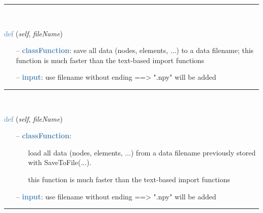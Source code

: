 \begin{itemize}[leftmargin=1.4cm]
\begin{itemize}[leftmargin=1.4cm]
\begin{itemize}[leftmargin=0.5cm]
\begin{itemize}[leftmargin=1.4cm]
\begin{itemize}[leftmargin=1.4cm]
\begin{itemize}[leftmargin=0.5cm]
%
\noindent\rule{8cm}{0.75pt}\vspace{1pt} \\ 
\begin{flushleft}
\noindent \textcolor{steelblue}{def {\bf {}}}\label{sec:FEM:FEMinterface:SaveToFile}
({\it self}, {\it fileName})
\end{flushleft}
\setlength{\itemindent}{0.7cm}
\begin{itemize}[leftmargin=0.7cm]
  \item[--]  \textcolor{steelblue}{\bf classFunction}: save all data (nodes, elements, ...) to a data filename; this function is much faster than the text-based import functions  \item[--]  \textcolor{steelblue}{\bf input}: use filename without ending ==> ".npy" will be added\vspace{12pt}\end{itemize}
%
\noindent\rule{8cm}{0.75pt}\vspace{1pt} \\ 
\begin{flushleft}
\noindent \textcolor{steelblue}{def {\bf {}}}\label{sec:FEM:FEMinterface:LoadFromFile}
({\it self}, {\it fileName})
\end{flushleft}
\setlength{\itemindent}{0.7cm}
\begin{itemize}[leftmargin=0.7cm]
  \item[--]  \textcolor{steelblue}{\bf classFunction}: \vspace{-6pt}
  \begin{itemize}[leftmargin=1.2cm]
\setlength{\itemindent}{-0.7cm}
    \item[] load all data (nodes, elements, ...) from a data filename previously stored with SaveToFile(...).
    \item[] this function is much faster than the text-based import functions
  \end{itemize}
  \item[--]  \textcolor{steelblue}{\bf input}: use filename without ending ==> ".npy" will be added\vspace{12pt}\end{itemize}
%
\noindent\rule{8cm}{0.75pt}\vspace{1pt} \\ 
\begin{flushleft}

\end{flushleft}
\end{itemize}
\end{itemize}
\end{itemize}
\end{itemize}
\end{itemize}
\end{itemize}
